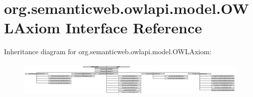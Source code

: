 \hypertarget{interfaceorg_1_1semanticweb_1_1owlapi_1_1model_1_1_o_w_l_axiom}{\section{org.\-semanticweb.\-owlapi.\-model.\-O\-W\-L\-Axiom Interface Reference}
\label{interfaceorg_1_1semanticweb_1_1owlapi_1_1model_1_1_o_w_l_axiom}
}
Inheritance diagram for org.\-semanticweb.\-owlapi.\-model.\-O\-W\-L\-Axiom\-:\begin{figure}[H]
\begin{center}
\leavevmode
\includegraphics[height=1.700835cm]{interfaceorg_1_1semanticweb_1_1owlapi_1_1model_1_1_o_w_l_axiom}
\end{center}
\end{figure}
